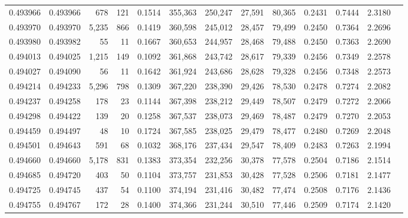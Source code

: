 \begin{tabular}{rrrrrrrrrrrrr}
0.493966 & 0.493966 &   678 &   121 &                                     0.1514 & 355,363 & 250,247 &  27,591 &  80,365 & 0.2431 & 0.7444 & 2.3180 \\
0.493970 & 0.493970 & 5,235 &   866 &                                     0.1419 & 360,598 & 245,012 &  28,457 &  79,499 & 0.2450 & 0.7364 & 2.2696 \\
0.493980 & 0.493982 &    55 &    11 &                                     0.1667 & 360,653 & 244,957 &  28,468 &  79,488 & 0.2450 & 0.7363 & 2.2690 \\
0.494013 & 0.494025 & 1,215 &   149 &                                     0.1092 & 361,868 & 243,742 &  28,617 &  79,339 & 0.2456 & 0.7349 & 2.2578 \\
0.494027 & 0.494090 &    56 &    11 &                                     0.1642 & 361,924 & 243,686 &  28,628 &  79,328 & 0.2456 & 0.7348 & 2.2573 \\
0.494214 & 0.494233 & 5,296 &   798 &                                     0.1309 & 367,220 & 238,390 &  29,426 &  78,530 & 0.2478 & 0.7274 & 2.2082 \\
0.494237 & 0.494258 &   178 &    23 &                                     0.1144 & 367,398 & 238,212 &  29,449 &  78,507 & 0.2479 & 0.7272 & 2.2066 \\
0.494298 & 0.494422 &   139 &    20 &                                     0.1258 & 367,537 & 238,073 &  29,469 &  78,487 & 0.2479 & 0.7270 & 2.2053 \\
0.494459 & 0.494497 &    48 &    10 &                                     0.1724 & 367,585 & 238,025 &  29,479 &  78,477 & 0.2480 & 0.7269 & 2.2048 \\
0.494501 & 0.494643 &   591 &    68 &                                     0.1032 & 368,176 & 237,434 &  29,547 &  78,409 & 0.2483 & 0.7263 & 2.1994 \\
0.494660 & 0.494660 & 5,178 &   831 &                                     0.1383 & 373,354 & 232,256 &  30,378 &  77,578 & 0.2504 & 0.7186 & 2.1514 \\
0.494685 & 0.494720 &   403 &    50 &                                     0.1104 & 373,757 & 231,853 &  30,428 &  77,528 & 0.2506 & 0.7181 & 2.1477 \\
0.494725 & 0.494745 &   437 &    54 &                                     0.1100 & 374,194 & 231,416 &  30,482 &  77,474 & 0.2508 & 0.7176 & 2.1436 \\
0.494755 & 0.494767 &   172 &    28 &                                     0.1400 & 374,366 & 231,244 &  30,510 &  77,446 & 0.2509 & 0.7174 & 2.1420 \\

\end{tabular}
